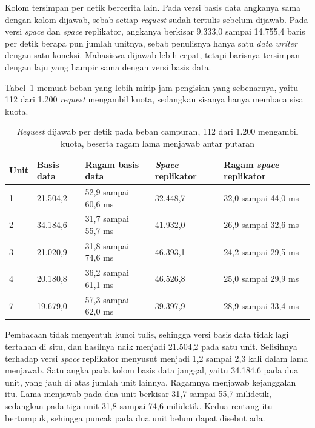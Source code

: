Kolom tersimpan per detik bercerita lain. Pada versi basis data angkanya sama
dengan kolom dijawab, sebab setiap \textit{request} sudah tertulis sebelum
dijawab. Pada versi \textit{space} dan \textit{space} replikator, angkanya
berkisar 9.333,0 sampai 14.755,4 baris per detik berapa pun jumlah unitnya, sebab penulisnya hanya satu
\textit{data writer} dengan satu koneksi.
Mahasiswa dijawab lebih cepat,
tetapi barisnya tersimpan dengan laju yang hampir sama dengan versi basis data.

Tabel~\ref{tab:hasil-campur} memuat beban yang lebih mirip jam pengisian yang
sebenarnya, yaitu 112 dari 1.200 \textit{request} mengambil kuota, sedangkan
sisanya hanya membaca sisa kuota.

\begin{table}[htbp]
  \centering
  \caption{\textit{Request} dijawab per detik pada beban campuran, 112 dari 1.200
    mengambil kuota, beserta ragam lama menjawab antar putaran}
  \label{tab:hasil-campur}
  \begin{tabularx}{\textwidth}{|l|l|X|l|X|}
    \hline
    \textbf{Unit} & \textbf{Basis data} & \textbf{Ragam basis data} & \textbf{\textit{Space} replikator} & \textbf{Ragam \textit{space} replikator} \\
    \hline
    1 & 21.504,2 & 52,9 sampai 60,6 ms & 32.448,7 & 32,0 sampai 44,0 ms \\
    \hline
    2 & 34.184,6 & 31,7 sampai 55,7 ms & 41.932,0 & 26,9 sampai 32,6 ms \\
    \hline
    3 & 21.020,9 & 31,8 sampai 74,6 ms & 46.393,1 & 24,2 sampai 29,5 ms \\
    \hline
    4 & 20.180,8 & 36,2 sampai 61,1 ms & 46.526,8 & 25,0 sampai 29,9 ms \\
    \hline
    7 & 19.679,0 & 57,3 sampai 62,0 ms & 39.397,9 & 28,9 sampai 33,4 ms \\
    \hline
  \end{tabularx}
\end{table}

Pembacaan tidak menyentuh kunci tulis, sehingga versi basis data tidak lagi
tertahan di situ, dan hasilnya naik menjadi 21.504,2 pada satu unit.
Selisihnya terhadap versi \textit{space} replikator menyusut menjadi 1,2 sampai
2,3 kali dalam lama menjawab. Satu angka pada kolom basis data janggal, yaitu 34.184,6 pada dua unit,
yang jauh di atas jumlah unit lainnya. Ragamnya menjawab kejanggalan itu. Lama
menjawab pada dua unit berkisar 31,7 sampai 55,7 milidetik, sedangkan pada tiga
unit 31,8 sampai 74,6 milidetik. Kedua rentang itu bertumpuk, sehingga puncak
pada dua unit belum dapat disebut ada.

